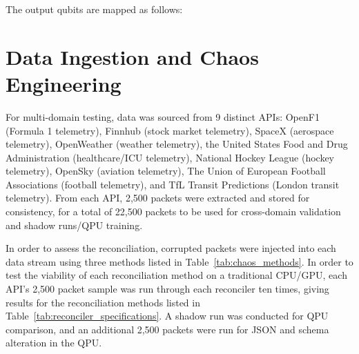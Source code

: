 \documentclass[journal]{IEEEtran}
\begin{document}
The output qubits are mapped as follows:
\begin{table}[htbp]
  \centering
  \small
  \caption{VQC Output Qubit Measurement Mapping to Reconciler Actions}
  \label{tab:vqc_output_mapping}
\end{table}


\section{Data Ingestion and Chaos Engineering}
For multi-domain testing, data was sourced from 9 distinct APIs: OpenF1 (Formula 1 telemetry), Finnhub (stock market telemetry), SpaceX (aerospace telemetry), OpenWeather (weather telemetry), the United States Food and Drug Administration (healthcare/ICU telemetry), National Hockey League (hockey telemetry), OpenSky (aviation telemetry), The Union of European Football Associations (football telemetry), and TfL Transit Predictions (London transit telemetry). From each API, 2,500 packets were extracted and stored for consistency, for a total of 22,500 packets to be used for cross-domain validation and shadow runs/QPU training.

In order to assess the reconciliation, corrupted packets were injected into each data stream using three methods listed in Table~\ref{tab:chaos_methods}. In order to test the viability of each reconciliation method on a traditional CPU/GPU, each API's 2,500 packet sample was run through each reconciler ten times, giving results for the reconciliation methods listed in Table~\ref{tab:reconciler_specifications}. A shadow run was conducted for QPU comparison, and an additional 2,500 packets were run for JSON and schema alteration in the QPU.
\end{document}
